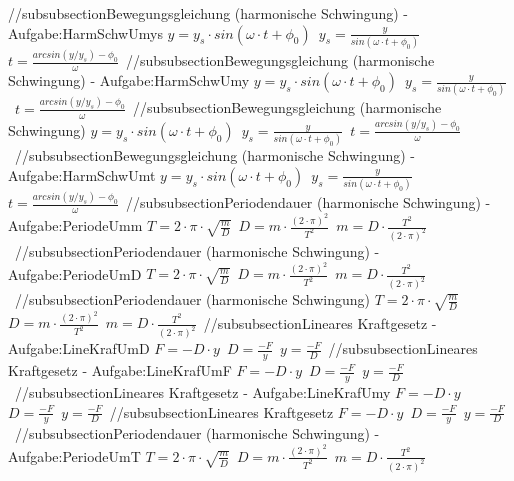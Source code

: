 //subsubsection{Bewegungsgleichung (harmonische Schwingung) - Aufgabe:HarmSchwUmys} 
$ y = y_{s} \cdot sin(\omega \cdot t+\phi _{0} ) $\ 
$ y_{s} = \frac{    y}{sin(\omega \cdot t+\phi _{0} )} $\ 
$ t = \frac{arcsin(y/y_{s} )-\phi _{0} }{    \omega } $\ 
//subsubsection{Bewegungsgleichung (harmonische Schwingung) - Aufgabe:HarmSchwUmy} 
$ y = y_{s} \cdot sin(\omega \cdot t+\phi _{0} ) $\ 
$ y_{s} = \frac{    y}{sin(\omega \cdot t+\phi _{0} )} $\ 
$ t = \frac{arcsin(y/y_{s} )-\phi _{0} }{    \omega } $\ 
//subsubsection{Bewegungsgleichung (harmonische Schwingung)} 
$ y = y_{s} \cdot sin(\omega \cdot t+\phi _{0} ) $\ 
$ y_{s} = \frac{    y}{sin(\omega \cdot t+\phi _{0} )} $\ 
$ t = \frac{arcsin(y/y_{s} )-\phi _{0} }{    \omega } $\ 
//subsubsection{Bewegungsgleichung (harmonische Schwingung) - Aufgabe:HarmSchwUmt} 
$ y = y_{s} \cdot sin(\omega \cdot t+\phi _{0} ) $\ 
$ y_{s} = \frac{    y}{sin(\omega \cdot t+\phi _{0} )} $\ 
$ t = \frac{arcsin(y/y_{s} )-\phi _{0} }{    \omega } $\ 
//subsubsection{Periodendauer (harmonische Schwingung) - Aufgabe:PeriodeUmm} 
$ T = 2\cdot \pi \cdot \sqrt{\frac{m}{D}} $\ 
$ D= m\cdot \frac{(2\cdot \pi )^{2} }{  T^{2} } $\ 
$ m= D\cdot \frac{ T^{2} }{(2\cdot \pi )^{2} } $\ 
//subsubsection{Periodendauer (harmonische Schwingung) - Aufgabe:PeriodeUmD} 
$ T = 2\cdot \pi \cdot \sqrt{\frac{m}{D}} $\ 
$ D= m\cdot \frac{(2\cdot \pi )^{2} }{  T^{2} } $\ 
$ m= D\cdot \frac{ T^{2} }{(2\cdot \pi )^{2} } $\ 
//subsubsection{Periodendauer (harmonische Schwingung)} 
$ T = 2\cdot \pi \cdot \sqrt{\frac{m}{D}} $\ 
$ D= m\cdot \frac{(2\cdot \pi )^{2} }{  T^{2} } $\ 
$ m= D\cdot \frac{ T^{2} }{(2\cdot \pi )^{2} } $\ 
//subsubsection{Lineares Kraftgesetz - Aufgabe:LineKrafUmD} 
$ F = -D\cdot y $\ 
$ D = \frac{-F}{y} $\ 
$ y = \frac{-F}{D} $\ 
//subsubsection{Lineares Kraftgesetz - Aufgabe:LineKrafUmF} 
$ F = -D\cdot y $\ 
$ D = \frac{-F}{y} $\ 
$ y = \frac{-F}{D} $\ 
//subsubsection{Lineares Kraftgesetz - Aufgabe:LineKrafUmy} 
$ F = -D\cdot y $\ 
$ D = \frac{-F}{y} $\ 
$ y = \frac{-F}{D} $\ 
//subsubsection{Lineares Kraftgesetz} 
$ F = -D\cdot y $\ 
$ D = \frac{-F}{y} $\ 
$ y = \frac{-F}{D} $\ 
//subsubsection{Periodendauer (harmonische Schwingung) - Aufgabe:PeriodeUmT} 
$ T = 2\cdot \pi \cdot \sqrt{\frac{m}{D}} $\ 
$ D= m\cdot \frac{(2\cdot \pi )^{2} }{  T^{2} } $\ 
$ m= D\cdot \frac{ T^{2} }{(2\cdot \pi )^{2} } $\ 
